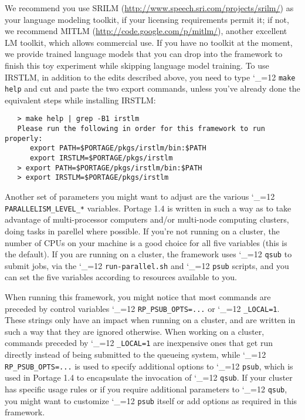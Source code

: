 \documentclass[11pt,letterpaper]{article}
\def\code{\begingroup\catcode`\_=12 \codex}
\newcommand{\codex}[1]{\texttt{#1}\endgroup}
\newcommand{\PS}{Portage 1.4\xspace}
\begin{document}
We recommend you use SRILM (\url{http://www.speech.sri.com/projects/srilm/}) as
your language modeling toolkit, if your licensing requirements permit it; if
not, we recommend MITLM (\url{http://code.google.com/p/mitlm/}), another
excellent LM toolkit, which allows commercial use.  If you have no toolkit at
the moment, we provide trained language models that you can drop into the
framework to finish this toy experiment while skipping language model training.
To use IRSTLM, in addition to the edits described above, you need to type
\code{make help} and cut and paste the two export commands, unless you've
already done the equivalent steps while installing IRSTLM:
\begin{small}
\begin{verbatim}
   > make help | grep -B1 irstlm
   Please run the following in order for this framework to run properly:
      export PATH=$PORTAGE/pkgs/irstlm/bin:$PATH
      export IRSTLM=$PORTAGE/pkgs/irstlm
   > export PATH=$PORTAGE/pkgs/irstlm/bin:$PATH
   > export IRSTLM=$PORTAGE/pkgs/irstlm
\end{verbatim}
\end{small}

Another set of parameters you might want to adjust are the various
\code{PARALLELISM_LEVEL_*} variables.  \PS is written in such a way as to
take advantage of multi-processor computers and/or multi-node computing
clusters, doing tasks in parellel where possible.  If you're not running on a
cluster, the number of CPUs on your machine is a good choice for all five
variables (this is the default).  If you are running on a cluster, the
framework uses \code{qsub} to submit jobs, via the \code{run-parallel.sh}
and \code{psub} scripts, and you can set the five variables according to
resources available to you.

When running this framework, you might notice that most commands are preceded
by control variables \code{RP_PSUB_OPTS=...} or \code{_LOCAL=1}.  These
strings only have an impact when running on a cluster, and are written in such
a way that they are ignored otherwise.  When working on a cluster, commands
preceded by \code{_LOCAL=1} are inexpensive ones that get
run directly instead of being submitted to the queueing system, while
\code{RP_PSUB_OPTS=...} is used to specify additional options to
\code{psub}, which is used in \PS to encapsulate the invocation of
\code{qsub}.  If your cluster has specific usage rules or if you require
additional parameters to \code{qsub}, you might want to customize
\code{psub} itself or add options as required in this framework.
\end{document}
